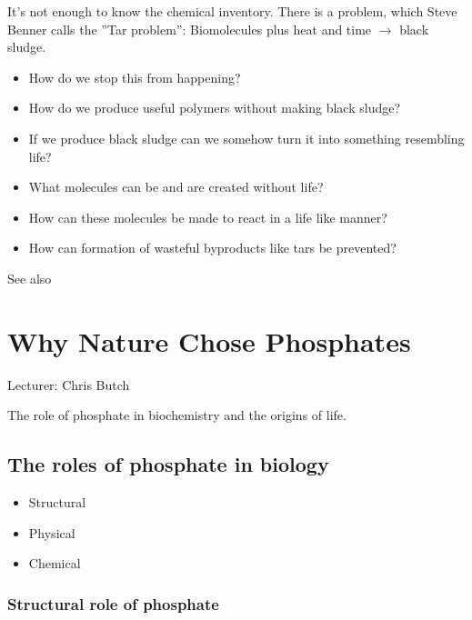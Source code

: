 \documentclass[]{article}
\begin{document}
It's not enough to know the chemical inventory. There is a problem, which Steve Benner calls the ''Tar problem'': Biomolecules plus heat and time $\rightarrow$ black sludge.\cite{benner2012asphalt}

\begin{itemize}
	\item How do we stop this from happening?
	\item How do we produce useful polymers without making black sludge? 
	\item If we produce black sludge can we somehow turn it into something resembling life?
	\item What molecules can be and are created without life?
	\item How can these molecules be made to react in a life like manner?
	\item How can formation of wasteful byproducts like	tars be prevented?
\end{itemize}


See also \cite{lazcano20031953}

\section{Why Nature Chose Phosphates}

Lecturer: Chris Butch

The role of phosphate in biochemistry and the origins of life.

\subsection{The roles of phosphate in biology}

\begin{itemize}
	\item Structural
	\item Physical
	\item Chemical
\end{itemize}

\subsubsection{Structural role of phosphate}
\end{document}
